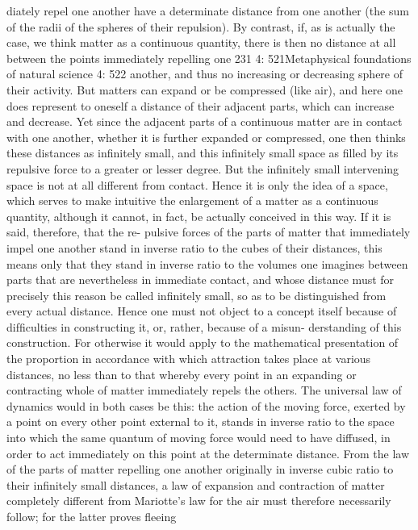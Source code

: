 diately repel one another have a determinate distance from one another
(the sum of the radii of the spheres of their repulsion). By contrast, if,
as is actually the case, we think matter as a continuous quantity, there
is then no distance at all between the points immediately repelling one
231
4: 521Metaphysical foundations of natural science
4: 522
another, and thus no increasing or decreasing sphere of their activity.
But matters can expand or be compressed (like air), and here one does
represent to oneself a distance of their adjacent parts, which can increase
and decrease. Yet since the adjacent parts of a continuous matter are in
contact with one another, whether it is further expanded or compressed,
one then thinks these distances as inﬁnitely small, and this inﬁnitely small
space as ﬁlled by its repulsive force to a greater or lesser degree. But
the inﬁnitely small intervening space is not at all different from contact.
Hence it is only the idea of a space, which serves to make intuitive the
enlargement of a matter as a continuous quantity, although it cannot, in
fact, be actually conceived in this way. If it is said, therefore, that the re-
pulsive forces of the parts of matter that immediately impel one another
stand in inverse ratio to the cubes of their distances, this means only that
they stand in inverse ratio to the volumes one imagines between parts
that are nevertheless in immediate contact, and whose distance must for
precisely this reason be called inﬁnitely small, so as to be distinguished
from every actual distance. Hence one must not object to a concept itself
because of difﬁculties in constructing it, or, rather, because of a misun-
derstanding of this construction. For otherwise it would apply to the
mathematical presentation of the proportion in accordance with which
attraction takes place at various distances, no less than to that whereby
every point in an expanding or contracting whole of matter immediately
repels the others. The universal law of dynamics would in both cases be
this: the action of the moving force, exerted by a point on every other
point external to it, stands in inverse ratio to the space into which the
same quantum of moving force would need to have diffused, in order to
act immediately on this point at the determinate distance.
From the law of the parts of matter repelling one another originally in
inverse cubic ratio to their inﬁnitely small distances, a law of expansion
and contraction of matter completely different from Mariotte’s law for
the air must therefore necessarily follow; for the latter proves ﬂeeing
